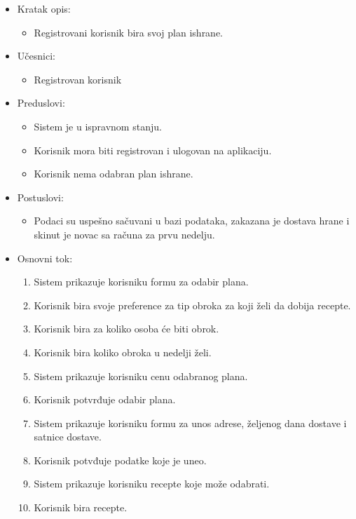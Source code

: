 \begin{itemize}
    \item Kratak opis:
        \begin{itemize}
            \item Registrovani korisnik bira svoj plan ishrane.
        \end{itemize}
    \item Učesnici:
        \begin{itemize}
            \item Registrovan korisnik
        \end{itemize}
    \item Preduslovi:
        \begin{itemize}
            \item Sistem je u ispravnom stanju.
            \item Korisnik mora biti registrovan i ulogovan na aplikaciju.
            \item Korisnik nema odabran plan ishrane.
        \end{itemize}
    \item Postuslovi:
        \begin{itemize}
            \item Podaci su uspešno sačuvani u bazi podataka, zakazana je dostava hrane i skinut je novac sa računa za prvu nedelju.
        \end{itemize}
    \item Osnovni tok:
        \begin{enumerate}
            \item Sistem prikazuje korisniku formu za odabir plana.
            \item Korisnik bira svoje preference za tip obroka za koji želi da dobija recepte.
            \item Korisnik bira za koliko osoba će biti obrok.
            \item Korisnik bira koliko obroka u nedelji želi.
            \item Sistem prikazuje korisniku cenu odabranog plana.
            \item Korisnik potvrđuje odabir plana.
            \item Sistem prikazuje korisniku formu za unos adrese, željenog dana dostave i satnice dostave.
            \item Korisnik potvđuje podatke koje je uneo.
            \item Sistem prikazuje korisniku recepte koje može odabrati.
            \item Korisnik bira recepte.

\end{enumerate}
\end{itemize}
